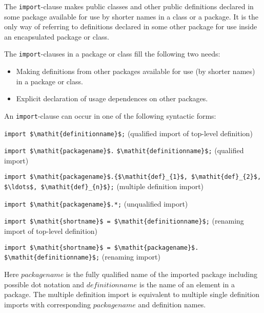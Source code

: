 The \lstinline!import!-clause makes public classes and other public definitions declared in some package available for use by shorter names in a class or a package.
It is the only way of referring to definitions declared in some other package for use inside an encapsulated package or class.

\begin{nonnormative}
The \lstinline!import!-clauses in a package or class fill the following two needs:
\begin{itemize}
\item
  Making definitions from other packages available for use (by shorter names) in a package or class.
\item
  Explicit declaration of usage dependences on other packages.
\end{itemize}
\end{nonnormative}

An \lstinline!import!-clause can occur in one of the following syntactic forms:


\lstinline!import $\mathit{definitionname}$;! (qualified import of top-level definition)

\lstinline!import $\mathit{packagename}$.!%
\lstinline!$\mathit{definitionname}$;! (qualified import)

\lstinline!import $\mathit{packagename}$.{$\mathit{def}_{1}$, $\mathit{def}_{2}$, $\ldots$, $\mathit{def}_{n}$};! (multiple definition import)

\lstinline!import $\mathit{packagename}$.*;! (unqualified import)

\lstinline!import $\mathit{shortname}$ = $\mathit{definitionname}$;! (renaming import of top-level definition)

\lstinline!import $\mathit{shortname}$ = $\mathit{packagename}$.!%
\lstinline!$\mathit{definitionname}$;! (renaming import)

Here $\mathit{packagename}$ is the fully qualified name of the imported package including possible dot notation and $\mathit{definitionname}$ is the name of an element in a package.  The multiple definition import is equivalent to multiple single definition imports with corresponding $\mathit{packagename}$ and definition names.

